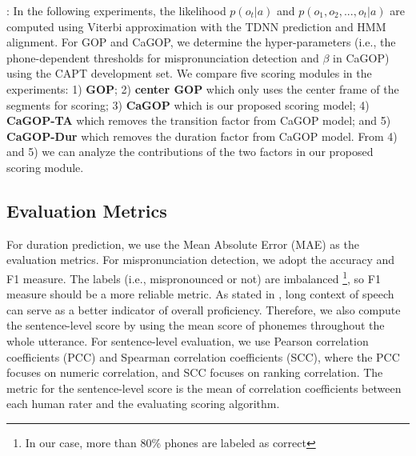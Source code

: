 \documentclass[a4paper]{article}
\begin{document}
\vspace{5pt}
:
In the following experiments, the likelihood $p(o_t|a)$ and $p(o_1, o_2, ..., o_t|a)$ are computed using Viterbi approximation with the TDNN prediction and HMM alignment. For GOP and CaGOP, we determine the hyper-parameters (i.e., the phone-dependent thresholds for mispronunciation detection and $\beta$ in CaGOP) using the CAPT development set.
We compare five scoring modules in the experiments: 1) \textbf{GOP}; 2) \textbf{center GOP} which only uses the center frame of the segments for scoring; 3)  \textbf{CaGOP} which is our proposed scoring model; 4)  \textbf{CaGOP-TA} which removes the transition factor from CaGOP model; and 5) \textbf{CaGOP-Dur} which removes the duration factor from CaGOP model. From 4) and 5) we can analyze the contributions of the two factors in our proposed scoring module. 
\vspace{-10pt}
\subsection{Evaluation Metrics}
For duration prediction, we use the Mean Absolute Error (MAE) as the evaluation metrics. For mispronunciation detection, we adopt the accuracy and F1 measure. The labels (i.e., mispronounced or not) are imbalanced \footnote{In our case, more than 80\% phones are labeled as correct}, so F1 measure should be a more reliable metric. As stated in \cite{li2016mispronunciation}, long context of speech can serve as a better indicator of overall proficiency. Therefore, we also compute the sentence-level score by using the mean score of phonemes throughout the whole utterance. For sentence-level evaluation, we use Pearson correlation coefficients (PCC) and Spearman correlation coefficients (SCC), where the PCC focuses on numeric correlation, and SCC focuses on ranking correlation. The metric for the sentence-level score is the mean of correlation coefficients between each human rater and the evaluating scoring algorithm. 
\vspace{-10pt}
\end{document}
